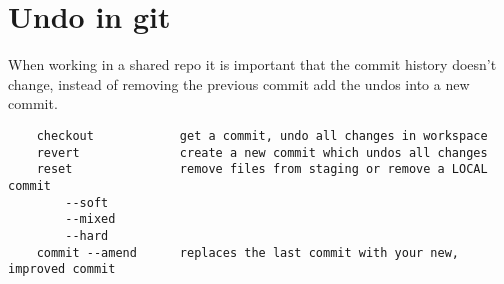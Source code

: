 \documentclass[10pt, a4paper]{article}
\begin{document}
\section*{Undo in git}
When working in a shared repo it is important that the commit history doesn't change, instead
of removing the previous commit add the undos into a new commit.
\begin{verbatim}
    checkout            get a commit, undo all changes in workspace
    revert              create a new commit which undos all changes
    reset               remove files from staging or remove a LOCAL commit
        --soft
        --mixed
        --hard
    commit --amend      replaces the last commit with your new, improved commit
\end{verbatim}
\end{document}
